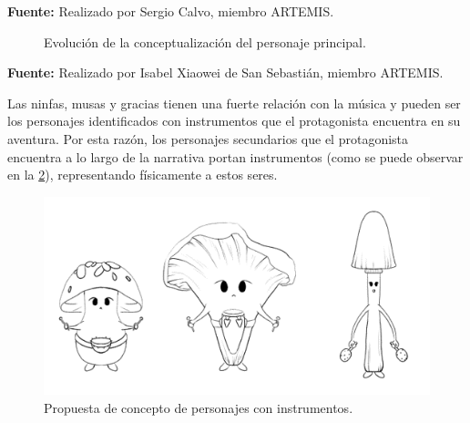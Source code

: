 \begin{center}
	\textbf{Fuente:} Realizado por Sergio Calvo, miembro ARTEMIS.
\end{center}

\begin{figure}[h!]
	\centering
	\hfil
	\caption{Evolución de la conceptualización del personaje principal.}
	\label{fig:MainCharacter}
	\vspace{-25pt}
\end{figure}

\begin{center}
	\textbf{Fuente:} Realizado por Isabel Xiaowei de San Sebastián, miembro ARTEMIS.
\end{center}

Las ninfas, musas y gracias tienen una fuerte relación con la música y pueden ser los personajes identificados con instrumentos que el protagonista encuentra en su aventura. Por esta razón, los personajes secundarios que el protagonista encuentra a lo largo de la narrativa portan instrumentos (como se puede observar en la \ref{fig:InstrumentCharacters}), representando físicamente a estos seres.

\begin{figure}[h!]
	\centering
	\includegraphics[width=0.3\linewidth]{Figuras/Desarrollo/InstrumentCharacters}
	\caption{Propuesta de concepto de personajes con instrumentos.}
	\label{fig:InstrumentCharacters}
	\vspace{-30pt}
\end{figure}

